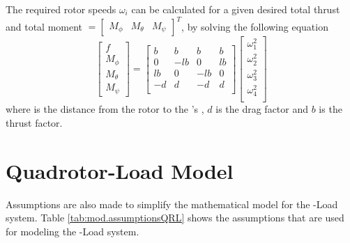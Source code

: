 The required rotor speeds $ \omega_i $ can be calculated for a given desired total thrust  and total moment $=\begin{bmatrix}	M_\phi&M_\theta&M_\psi	\end{bmatrix}^T  $, by solving the following equation
\begin{equation}\label{eq:omega_i}
\begin{bmatrix}
f\\M_\phi\\M_\theta\\M_\psi
\end{bmatrix}=
\begin{bmatrix}
b&b&b&b\\
0&-lb&0&lb\\
lb&0&-lb&0\\
-d&d&-d&d\\
\end{bmatrix}
\begin{bmatrix}
\omega_1^2\\
\omega_2^2\\
\omega_3^2\\
\omega_4^2\\
\end{bmatrix}
\end{equation}
where  is the distance from the rotor to the 's , $ d $ is the drag factor and $ b $ is the thrust factor. 
 
\newpage
\section{Quadrotor-Load Model}	\label{sec:mod.QRLmod}

Assumptions are also made to simplify the mathematical model for the -Load system.
Table \ref{tab:mod.assumptionsQRL} shows the assumptions that are used for modeling the -Load system. 


